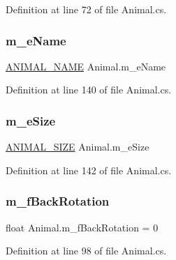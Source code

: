 Definition at line 72 of file Animal.\+cs.

\mbox{\label{class_animal_a1d3cac16f6206eb338093a632d644d9f}} 
\subsubsection{\texorpdfstring{m\+\_\+e\+Name}{m\_eName}}
{\footnotesize\ttfamily \mbox{\hyperlink{_animal_8cs_a2fa5713399b84d1b88dae9196837af50}{A\+N\+I\+M\+A\+L\+\_\+\+N\+A\+ME}} Animal.\+m\+\_\+e\+Name}



Definition at line 140 of file Animal.\+cs.

\mbox{\label{class_animal_a832155594812fbbf3b2ed1a698835ee0}} 
\subsubsection{\texorpdfstring{m\+\_\+e\+Size}{m\_eSize}}
{\footnotesize\ttfamily \mbox{\hyperlink{_animal_8cs_ad0d15cd79bb3e3a97e7fb817f1438fcc}{A\+N\+I\+M\+A\+L\+\_\+\+S\+I\+ZE}} Animal.\+m\+\_\+e\+Size}



Definition at line 142 of file Animal.\+cs.

\mbox{\label{class_animal_ae0c82e64109cba8e3186bec644f72ff4}} 
\subsubsection{\texorpdfstring{m\+\_\+f\+Back\+Rotation}{m\_fBackRotation}}
{\footnotesize\ttfamily float Animal.\+m\+\_\+f\+Back\+Rotation = 0}



Definition at line 98 of file Animal.\+cs.

\mbox{\label{class_animal_ad159aee4f8a2e5277b2eb5fce15ac797}} 
